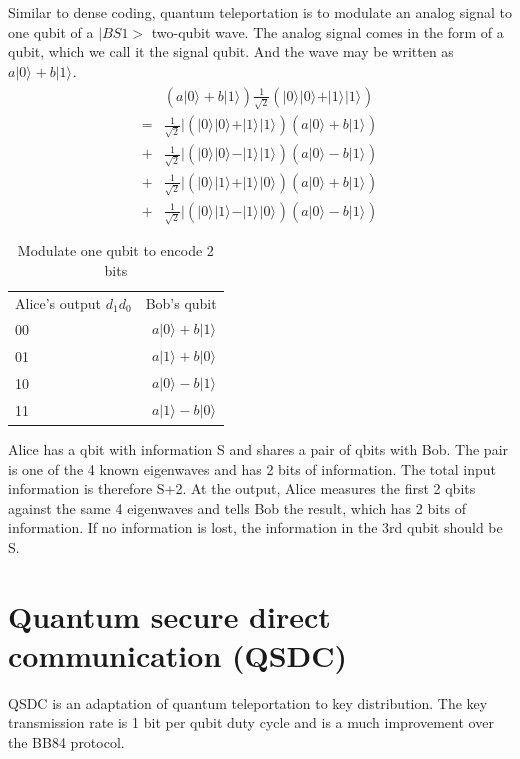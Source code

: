 \documentclass{book}
\newcommand{\keta}[2][]{\vert {#2} \rangle_{#1}}
\begin{document}
Similar to dense coding, quantum teleportation is to modulate an analog signal to one qubit of a $|BS1>$ two-qubit wave. The analog signal comes in the form of a qubit, which we call it the signal qubit. And the wave may be written as $a \keta{0} + b\keta{1}$.
\begin{equation}\label{}
\begin{array}{rl}
    & (a \keta{0} + b\keta{1}) \frac 1 {\sqrt 2}(\keta{0}\keta{0}+\keta{1}\keta{1}) \\
    = & \frac 1 {\sqrt 2}| (\keta{0}\keta{0}+\keta{1}\keta{1}) (a \keta{0} + b\keta{1}) \\
    +& \frac 1 {\sqrt 2}| (\keta{0}\keta{0}-\keta{1}\keta{1}) (a \keta{0} - b\keta{1}) \\
    +& \frac 1 {\sqrt 2}| (\keta{0}\keta{1}+\keta{1}\keta{0}) (a \keta{0} + b\keta{1}) \\
    +& \frac 1 {\sqrt 2}| (\keta{0}\keta{1}-\keta{1}\keta{0}) (a \keta{0} - b\keta{1})
\end{array}
\end{equation}

\begin{table}[]
\caption{Modulate one qubit to encode 2 bits}
\label{TeleportationTable}
\begin{tabular}{lr}
Alice's output $d_1 d_0$ & Bob's qubit  \\
00 & $a\keta{0}+b\keta{1}$ \\
01 & $a\keta{1}+b\keta{0}$ \\
10 & $a\keta{0}-b\keta{1}$  \\
11 & $a\keta{1}-b\keta{0}$ 
\end{tabular}
\end{table}

Alice has a qbit with information S and shares a pair of qbits with Bob. The pair is one of the 4 known eigenwaves and has 2 bits of information. The total input information is therefore S+2. At the output, Alice measures the first 2 qbits against the same 4 eigenwaves and tells Bob the result, which has 2 bits of information. If no information is lost, the information in the 3rd qubit should be S.

\section{Quantum secure direct communication (QSDC)}
QSDC is an adaptation of quantum teleportation to key distribution. The key transmission rate is 1 bit per qubit duty cycle and is a much improvement over the BB84 protocol.
\end{document}
